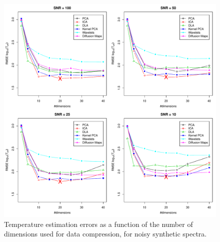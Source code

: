 \documentclass[a4paper,fleqn,usenatbib]{mnras}
\begin{document}
{{{%

\begin{figure}
\centering\includegraphics[width=\textwidth]{flamesHR10_Teff_log_BestSVM_N-RMSE_test.pdf}
\caption{Temperature estimation errors as a function of the number of
  dimensions used for data compression, for noisy synthetic
  spectra.}
\label{fig:02}
\end{figure}


}}}
\end{document}
